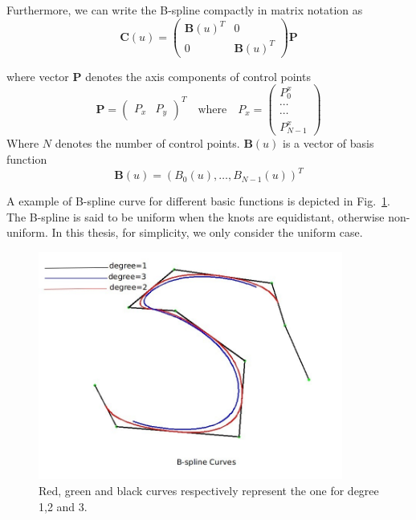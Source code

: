 Furthermore, we can write the B-spline compactly in matrix notation as 
\begin{equation}
  \label{eq:4.3}
  \mathbf{C}(u) = 
  \begin{pmatrix}
\mathbf{B}(u)^T & 0 \\
0 &\mathbf{B}(u)^T
  \end{pmatrix}
\mathbf{P}
\end{equation}

where vector $\mathbf{P}$ denotes the axis components of control
points
\begin{equation}
  \label{eq:4.4}
  \mathbf{P} =
  \begin{pmatrix}
    P_x & P_y    
  \end{pmatrix}^T \quad \mathrm{where} \quad P_x =
  \begin{pmatrix}
    P_0^x\\
    \cdots\\
    \cdots\\
    P_{N-1}^x
  \end{pmatrix}
\end{equation}
Where $N$ denotes the number of control points. $\mathbf{B}(u)$ is a
vector of basis function
\begin{equation}
  \label{eq:4.5}
  \mathbf{B}(u) = (B_0(u), \ldots, B_{N-1}(u))^T
\end{equation}

A example of B-spline curve for different basic functions is depicted
in Fig.~\ref{fig:bspline}. The B-spline is said to be uniform when the knots are equidistant,
otherwise non-uniform. In this thesis, for simplicity, we only
consider the uniform case.
\begin{figure}[htb]
  \centering
  \includegraphics[width=10cm]{images/bspline.jpg}
  \caption[B-spline curves for different degrees~\cite{contourpanin2011}]{Red, green and black
    curves respectively represent the one for degree 1,2 and 3.}
\label{fig:bspline}
\end{figure}

